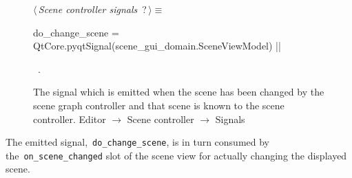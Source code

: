 \documentclass[%
    a4paper,    %
    justified,  %
    nobib,      %
    openany     %
]{tufte-book}
\makeatletter
\renewcommand{\label}[1]{\@tufte@label{##1}}%
\makeatother
\begin{document}
\begin{figure}
\begin{flushleft} \small
\begin{minipage}{\linewidth}\label{scrap96}\raggedright\small
{} $\langle\,${\itshape Scene controller signals}\nobreak\ {\footnotesize {?}}$\,\rangle\equiv$
\vspace{-1ex}
\begin{pythoncode}
do_change_scene = QtCore.pyqtSignal(scene_gui_domain.SceneViewModel)
|\NWsep|
\end{pythoncode}
\vspace{1.5ex}
\footnotesize
\begin{list}{}{\setlength{\itemsep}{-\parsep}\setlength{\itemindent}{-\leftmargin}}
\item \NWtxtMacroRefIn\ .

\item{}
\end{list}
\end{minipage}\vspace{4ex}
\end{flushleft}
\caption{The signal which is emitted when the scene has been changed by the
  scene graph controller and that scene is known to the scene controller.
  \newline{}\newline{}Editor $\rightarrow$ Scene controller $\rightarrow$
  Signals}
\label{editor:lst:scene-controller:signals:do-change-scene}
\end{figure}

The emitted signal,~\verb=do_change_scene=, is in turn consumed by
the~\verb=on_scene_changed= slot of the scene view for actually changing the
displayed scene.
\end{document}

